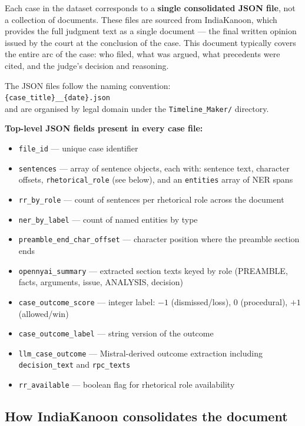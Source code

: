 \documentclass[12pt,a4paper]{article}
\begin{document}
Each case in the dataset corresponds to a \textbf{single consolidated JSON file}, not a collection of documents. These files are sourced from IndiaKanoon, which provides the full judgment text as a single document — the final written opinion issued by the court at the conclusion of the case. This document typically covers the entire arc of the case: who filed, what was argued, what precedents were cited, and the judge's decision and reasoning.

The JSON files follow the naming convention:\\
\texttt{\{case\_title\}\_\_\{date\}.json}\\
and are organised by legal domain under the \texttt{Timeline\_Maker/} directory.

\textbf{Top-level JSON fields present in every case file:}
\begin{itemize}[noitemsep]
  \item \texttt{file\_id} — unique case identifier
  \item \texttt{sentences} — array of sentence objects, each with: sentence text, character offsets, \texttt{rhetorical\_role} (see below), and an \texttt{entities} array of NER spans
  \item \texttt{rr\_by\_role} — count of sentences per rhetorical role across the document
  \item \texttt{ner\_by\_label} — count of named entities by type
  \item \texttt{preamble\_end\_\allowbreak char\_offset} — character position where the preamble section ends
  \item \texttt{opennyai\_summary} — extracted section texts keyed by role (PREAMBLE, facts, arguments, issue, ANALYSIS, decision)
  \item \texttt{case\_outcome\_score} — integer label: $-1$ (dismissed/loss), $0$ (procedural), $+1$ (allowed/win)
  \item \texttt{case\_outcome\_label} — string version of the outcome
  \item \texttt{llm\_case\_outcome} — Mistral-derived outcome extraction including \texttt{decision\_text} and \texttt{rpc\_texts}
  \item \texttt{rr\_available} — boolean flag for rhetorical role availability
\end{itemize}

\subsection{How IndiaKanoon consolidates the document}
\end{document}
